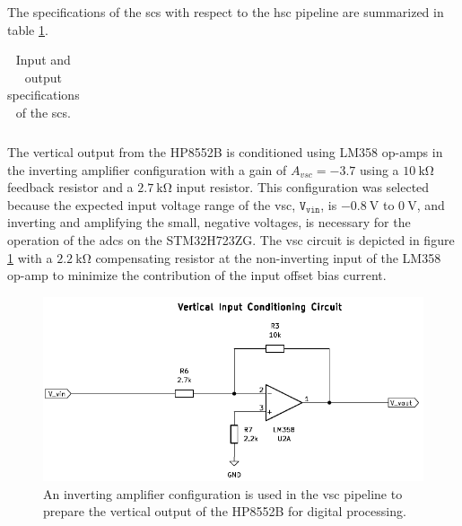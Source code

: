 \documentclass[class=report,11pt,crop=false]{standalone}
\begin{document}
	The specifications of the \acrshort{scs} with respect to the \acrshort{hsc} pipeline are summarized in table \ref{tab:sig-cond-hsc-specs}. 
	
	\begin{table}[ht!]
		\centering
		\label{tab:sig-cond-hsc-specs}
		\caption{Input and output specifications of the \acrshort{scs}.}
		\begin{tabular}{ccc}
			
		\end{tabular}
	\end{table}
	
	The vertical output from the HP8552B is conditioned using LM358 op-amps in the inverting amplifier configuration with a gain of $A_{vsc} = -3.7$ using a $\SI{10}{\kilo\ohm}$ feedback resistor and a $\SI{2.7}{\kilo\ohm}$ input resistor. This configuration was selected because the expected input voltage range of the \acrlong{vsc}, $\texttt{V}_\texttt{vin}$, is $-\SI{0.8}{\volt}$ to $\SI{0}{\volt}$, and inverting and amplifying the small, negative voltages, is necessary for the operation of the \acrshort{adc}s on the STM32H723ZG. The \acrshort{vsc} circuit is depicted in figure \ref{fig:sig-cond-vsc-schematic} with a $\SI{2.2}{\kilo\ohm}$ compensating resistor at the non-inverting input of the LM358 op-amp to minimize the contribution of the input offset bias current.
	
	\begin{figure}[h!]
		\centering
		\includegraphics[width=0.7\linewidth]{Figures/Methodology/sig-cond-vsc-schematic}
		\caption{An inverting amplifier configuration is used in the \acrshort{vsc} pipeline to prepare the vertical output of the HP8552B for digital processing.}
		\label{fig:sig-cond-vsc-schematic}
	\end{figure}
	
\end{document}
